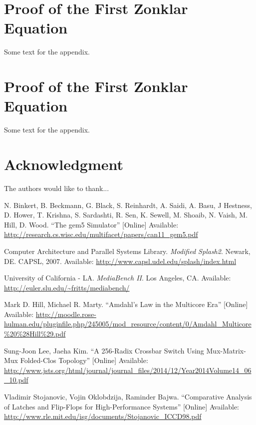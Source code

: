 \documentclass[journal]{IEEEtran}
\begin{document}
\appendices
\section{Proof of the First Zonklar Equation}
Some text for the appendix.

\section{Proof of the First Zonklar Equation}
Some text for the appendix.

\section*{Acknowledgment}
The authors would like to thank...

\begin{thebibliography}{1}
    N. Binkert, B. Beckmann, G. Black, S. Reinhardt, A. Saidi, A. Basu, J Hestness, D. Hower, T. Krishna, S. Sardashti, R. Sen, K. Sewell, M. Shoaib, N. Vaish, M. Hill, D. Wood. ``The gem5 Simulator'' [Online]
    Available: \url{http://research.cs.wisc.edu/multifacet/papers/can11_gem5.pdf}

    Computer Architecture and Parallel Systems Library. \textit{Modified Splash2}. Newark, DE. CAPSL, 2007.
    Available: \url{http://www.capsl.udel.edu/splash/index.html}

    University of California - LA. \textit{MediaBench II}. Los Angeles, CA.
    Available: \url{http://euler.slu.edu/~fritts/mediabench/}

    Mark D. Hill, Michael R. Marty. ``Amdahl’s Law in the Multicore Era'' [Online]
    Available: \url{http://moodle.rose-hulman.edu/pluginfile.php/245005/mod_resource/content/0/Amdahl_Multicore%20%28Hill%29.pdf}

    Sung-Joon Lee, Jaeha Kim. ``A 256-Radix Crossbar Switch Using Mux-Matrix-Mux Folded-Clos Topology'' [Online]
    Available: \url{http://www.jsts.org/html/journal/journal_files/2014/12/Year2014Volume14_06_10.pdf}

    Vladimir Stojanovic, Vojin Oklobdzija, Raminder Bajwa. ``Comparative Analysis of Latches and Flip-Flops for High-Performance Systems'' [Online]
    Available: \url{http://www.rle.mit.edu/isg/documents/Stojanovic_ICCD98.pdf}
\end{thebibliography}

\end{document}
